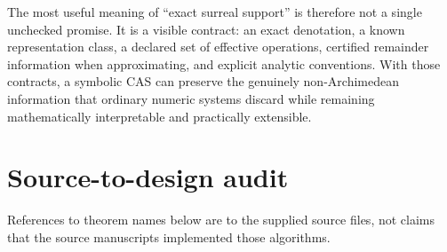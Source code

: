 \documentclass[11pt,letterpaper]{article}
\theoremstyle{definition}
\numberwithin{equation}{section}
\begin{document}
The most useful meaning of ``exact surreal support'' is therefore not a single unchecked promise. It is a visible contract: an exact denotation, a known representation class, a declared set of effective operations, certified remainder information when approximating, and explicit analytic conventions. With those contracts, a symbolic CAS can preserve the genuinely non-Archimedean information that ordinary numeric systems discard while remaining mathematically interpretable and practically extensible.

\appendix
\section{Source-to-design audit}\label{app:audit}
References to theorem names below are to the supplied source files, not claims that the source manuscripts implemented those algorithms.
\end{document}
